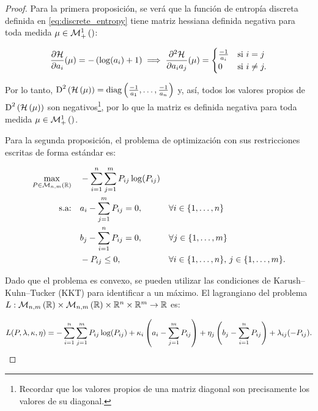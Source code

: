 \begin{proof}
	Para la primera proposición, se verá que la función de entropía discreta definida en \eqref{eq:discrete_entropy} tiene matriz hessiana definida negativa para toda medida $\mu\in\mathcal{M}_+^1\left(\right)$:

	\begin{equation*}
		\frac{\partial\mathcal{H}}{\partial a_i}(\mu) = -\left(\log(a_i) + 1\right)
		\implies \frac{\partial^2\mathcal{H}}{\partial a_i a_j}(\mu) =
		\begin{cases}
			\frac{-1}{a_i} & \text{si } i=j     \\
			0              & \text{si } i\neq j .
		\end{cases}
	\end{equation*}

	Por lo tanto, $\operatorname{D}^2\left(\mathcal{H}\left(\mu\right)\right) = \operatorname{diag}\left(\frac{-1}{a_1},\ldots,\frac{-1}{a_n}\right)$ y, así, todos los valores propios de $\operatorname{D}^2\left(\mathcal{H}\left(\mu\right)\right)$ son negativos\footnote{Recordar que los valores propios de una matriz diagonal son precisamente los valores de su diagonal.}, por lo que la matriz es definida negativa para toda medida $\mu\in\mathcal{M}_+^1\left(\right)$.

	Para la segunda proposición, el problema de optimización con sus restricciones escritas de forma estándar es:

	\begin{alignat*}{3}
		\max_{P\in\mathcal{M}_{n,m}\left(\mathbb{R}\right)} \quad & -\sum_{i=1}^n \sum_{j=1}^m P_{ij}\log(P_{ij}) &  &                                                  \\
		\text{s.a:} \quad                      & a_i - \sum_{j=1}^m P_{ij} = 0,\quad           &  & \forall i\in\{1,\ldots,n\}                       \\
		                                       & b_j - \sum_{i=1}^n P_{ij} = 0,\quad           &  & \forall j\in\{1,\ldots,m\}                       \\
		                                       & -P_{ij}\leq 0, \quad                          &  & \forall i\in\{1,\ldots,n\},\, j\in\{1,\ldots,m\}.
	\end{alignat*}

	Dado que el problema es convexo, se pueden utilizar las condiciones de Karush–Kuhn–Tucker (KKT) para identificar a un máximo. El lagrangiano del problema $L:\mathcal{M}_{n,m}\left(\mathbb{R}\right)\times\mathcal{M}_{n,m}\left(\mathbb{R}\right)\times\mathbb{R}^n\times\mathbb{R}^m\to\mathbb{R}$ es:

	\begin{equation*}
		L(P,\lambda,\kappa,\eta) =
		-\sum_{i=1}^n \sum_{j=1}^m P_{ij}\log(P_{ij})
		+ \kappa_i \left(a_i - \sum_{j=1}^m P_{ij}\right)
		+ \eta_j \left(b_j - \sum_{i=1}^n P_{ij}\right)
		+ \lambda_{ij}(-P_{ij}).
	\end{equation*}


\end{proof}
